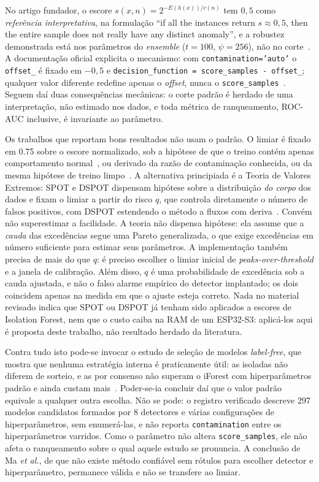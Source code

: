 \documentclass[11pt,a4paper]{article}
\begin{document}
No artigo fundador, o escore $s(x,n) = 2^{-E(h(x))/c(n)}$ tem $0,5$ como \emph{referência
interpretativa}, na formulação ``if all the instances return $s \approx 0,5$, then the
entire sample does not really have any distinct anomaly'', e a robustez demonstrada está
nos parâmetros do \emph{ensemble} ($t = \num{100}$, $\psi = \num{256}$), não no
corte~\cite{liu2008}. A documentação oficial explicita o mecanismo: com
\texttt{contamination='auto'} o \texttt{offset\_} é fixado em $-0,5$ e
\texttt{decision\_function = score\_samples - offset\_}; qualquer valor diferente redefine
apenas o \emph{offset}, nunca o \texttt{score\_samples}~\cite{scikitlearn2026}. Seguem daí
duas consequências mecânicas: o corte padrão é herdado de uma interpretação, não estimado
nos dados, e toda métrica de ranqueamento, ROC-AUC inclusive, é invariante ao parâmetro.

Os trabalhos que reportam bons resultados não usam o padrão. O limiar é fixado em
\num{0,75} sobre o escore normalizado, sob a hipótese de que o treino contém apenas
comportamento normal~\cite{antonini2023}, ou derivado da razão de contaminação conhecida,
ou da mesma hipótese de treino limpo~\cite{brito2022}. A alternativa principiada é a
Teoria de Valores Extremos: SPOT e DSPOT dispensam hipótese sobre a distribuição
\emph{do corpo} dos dados e fixam o limiar a partir do risco $q$, que controla diretamente
o número de falsos positivos, com DSPOT estendendo o método a fluxos com
deriva~\cite{siffer2017}. Convém não superestimar a facilidade. A teoria não dispensa
hipótese: ela assume que a \emph{cauda} das excedências segue uma Pareto generalizada, o
que exige excedências em número suficiente para estimar seus parâmetros. A implementação
também precisa de mais do que $q$: é preciso escolher o limiar inicial de
\emph{peaks-over-threshold} e a janela de calibração. Além disso, $q$ é uma probabilidade
de excedência sob a cauda ajustada, e não o falso alarme empírico do detector implantado;
os dois coincidem apenas na medida em que o ajuste esteja correto. Nada no material
revisado indica que SPOT ou DSPOT já tenham sido aplicados a escores de Isolation Forest,
nem que o custo caiba na RAM de um ESP32-S3: aplicá-los aqui é proposta deste trabalho,
não resultado herdado da literatura.

Contra tudo isto pode-se invocar o estudo de seleção de modelos \emph{label-free}, que
mostra que nenhuma estratégia interna é praticamente útil: as isoladas não diferem de
sorteio, e as por consenso não superam o iForest com hiperparâmetros padrão e ainda custam
mais~\cite{ma2023}. Poder-se-ia concluir daí que o valor padrão equivale a qualquer outra escolha.
Não se pode: o registro verificado descreve \num{297} modelos candidatos formados por
\num{8} detectores e várias configurações de hiperparâmetros, sem enumerá-las, e não
reporta \texttt{contamination} entre os hiperparâmetros varridos. Como o parâmetro não
altera \texttt{score\_samples}, ele não afeta o ranqueamento sobre o qual aquele estudo se
pronuncia. A conclusão de Ma \emph{et al.}, de que não existe método confiável sem rótulos
para escolher detector e hiperparâmetro, permanece válida e não se transfere ao limiar.
\end{document}
